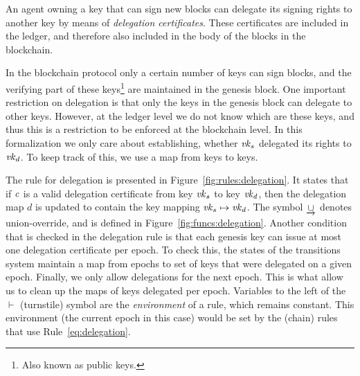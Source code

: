\newcommand{\DCert}{\type{DCert}}
\newcommand{\DState}{\type{DState}}
\newcommand{\DEState}{\type{DEState}}

An agent owning a key that can sign new blocks can delegate its signing rights
to another key by means of \textit{delegation certificates}. These certificates
are included in the ledger, and therefore also included in the body of the
blocks in the blockchain.

In the blockchain protocol only a certain number of keys can sign blocks, and
the verifying part of these keys\footnote{Also known as public keys.} are
maintained in the genesis block. One important restriction on delegation is
that only the keys in the genesis block can delegate to other keys. However, at
the ledger level we do not know which are these keys, and thus this is a
restriction to be enforced at the blockchain level. In this formalization we
only care about establishing, whether $\mathit{vk}_s$ delegated its rights to
$\mathit{vk}_d$. To keep track of this, we use a map from keys to keys.

The rule for delegation is presented in
Figure~\ref{fig:rules:delegation}. It states that if $\mathit{c}$ is a valid
delegation certificate from key $\mathit{vk}_s$ to key $\mathit{vk}_d$, then the
delegation map $d$ is updated to contain the key mapping
$\mathit{vk}_s \mapsto \mathit{vk}_d$. The symbol $\mathbin{\underrightarrow\cup}$ denotes
union-override, and is defined in Figure~\ref{fig:funcs:delegation}. Another
condition that is checked in the delegation rule is that each genesis key can
issue at most one delegation certificate per epoch. To check this, the states
of the transitions system maintain a map from epochs to set of keys that were
delegated on a given epoch. Finally, we only allow delegations for the next
epoch. This is what allow us to clean up the maps of keys delegated per epoch.
Variables to the left of the $\vdash$ (turnstile) symbol are the
\textit{environment} of a rule, which remains constant. This environment (the
current epoch in this case) would be set by the (chain) rules that use
Rule~\ref{eq:delegation}.

